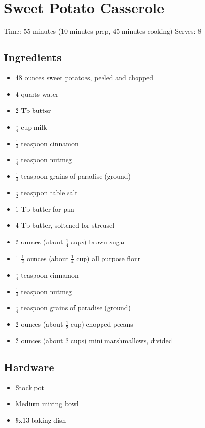 \section{Sweet Potato Casserole}
\label{sweetPotatoCasserole}
\setcounter{secnumdepth}{0}
Time: 55 minutes (10 minutes prep, 45 minutes cooking)
Serves: 8

\begin{multicols}{2}
\subsection*{Ingredients}
\begin{itemize}
    \item 48 ounces sweet potatoes, peeled and chopped
    \item 4 quarts water
    \item 2 Tb butter
    \item \( \frac{1}{4} \) cup milk
    \item \( \frac{1}{4} \) teaspoon cinnamon
    \item \( \frac{1}{4} \) teaspoon nutmeg
    \item \( \frac{1}{4} \) teaspoon grains of paradise (ground)
    \item \( \frac{1}{2} \) teasppon table salt
    \item 1 Tb butter for pan
    \item 4 Tb butter, softened for streusel
    \item 2 ounces (about \( \frac{1}{4} \) cups) brown sugar
    \item 1 \( \frac{1}{2} \) ounces (about \( \frac{1}{4} \) cup) all purpose flour
    \item \( \frac{1}{4} \) teaspoon cinnamon
    \item \( \frac{1}{4} \) teaspoon nutmeg
    \item \( \frac{1}{4} \) teaspoon grains of paradise (ground)
    \item 2 ounces (about \( \frac{1}{2} \) cup) chopped pecans
    \item 2 ounces (about 3 cups) mini marshmallows, divided
\end{itemize}

\subsection*{Hardware}
\begin{itemize}
    \item Stock pot
    \item Medium mixing bowl
    \item 9x13 baking dish
\end{itemize}
\clearpage


\end{multicols}
